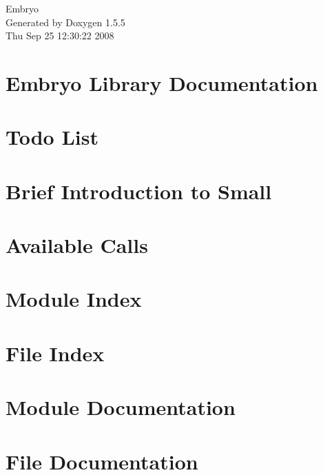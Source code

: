 \documentclass[a4paper]{book}
\begin{document}
\begin{titlepage}
\vspace*{7cm}
\begin{center}
{\Large Embryo }\\
\vspace*{1cm}
{\large Generated by Doxygen 1.5.5}\\
\vspace*{0.5cm}
{\small Thu Sep 25 12:30:22 2008}\\
\end{center}
\end{titlepage}
\clearemptydoublepage
{}
\tableofcontents
\clearemptydoublepage
{}
\chapter{Embryo Library Documentation }
\label{index}\hypertarget{index}{}
\chapter{Todo List}

\chapter{Brief Introduction to Small}

\chapter{Available Calls}

\chapter{Module Index}

\chapter{File Index}

\chapter{Module Documentation}












\chapter{File Documentation}

\printindex
\end{document}
